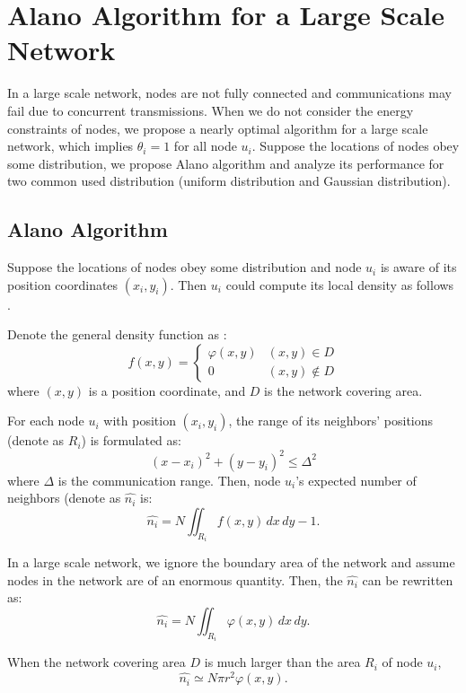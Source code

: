 \section{Alano Algorithm for a Large Scale Network}
\label{PCN}


In a large scale network, nodes are not fully connected and communications may fail due to concurrent transmissions. 
When we do not consider the energy constraints of nodes, we propose a nearly optimal algorithm for a large scale network, which implies $\theta_i = 1$ for all node $u_i$.
Suppose the locations of nodes obey some distribution, we propose Alano algorithm and analyze its performance for two common used distribution (uniform distribution and Gaussian distribution).

\subsection{Alano Algorithm}
Suppose the locations of nodes obey some distribution and node $u_i$ is aware of its position coordinates $(x_i, y_i)$.
Then $u_i$ could compute its local density as follows \cite{meester1996continuum, wang2015connectivity}.

Denote the general density function as :
$$f(x,y)=
\begin{cases}
\varphi(x,y)& (x,y)\in D\\
0& (x,y)\notin D
\end{cases}$$
where $(x,y)$ is a position coordinate, and $D$ is the network covering area.

For each node $u_i$ with position $(x_i,y_i)$, the range of its neighbors' positions (denote as $R_i$) is formulated as:
$$
(x-x_i)^2+(y-y_i)^2 \leq \Delta^2
$$
where $\Delta$ is the communication range. Then, node $u_i$'s expected number of neighbors (denote as $\hat{n_i}$ is:
$$
\hat{n_i} = N\iint_{R_i} f(x,y)\,dx\,dy - 1.
$$

In a large scale network, we ignore the boundary area of the network and assume nodes in the network are of an enormous quantity. Then, the $\hat{n_i}$ can be rewritten as:
$$
\hat{n_i} = N\iint_{R_i} \varphi(x,y)\,dx\,dy.
$$

When the network covering area $D$ is much larger than the area $R_i$ of node $u_i$, 
\begin{equation}
\label{eqnNB}
\hat{n_i} \simeq N\pi r^2 \varphi(x,y).
\end{equation}


